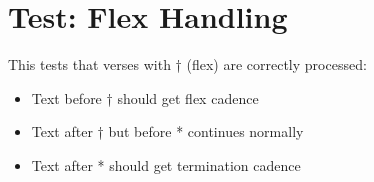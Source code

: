 \documentclass{article}
\begin{document}
\section*{Test: Flex Handling}

This tests that verses with † (flex) are correctly processed:
\begin{itemize}
\item Text before † should get flex cadence
\item Text after † but before * continues normally
\item Text after * should get termination cadence
\end{itemize}

\bigskip

\end{document}
